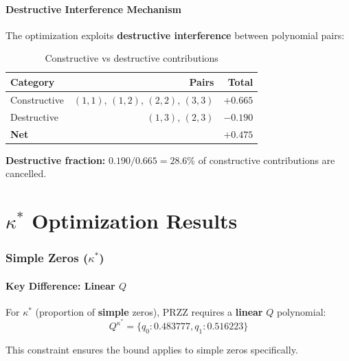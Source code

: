 \documentclass[11pt]{article}
\begin{document}
\subsection{Destructive Interference Mechanism}

The optimization exploits \textbf{destructive interference} between polynomial pairs:

\begin{table}[h]
\centering
\caption{Constructive vs destructive contributions}
\begin{tabular}{lrr}
\toprule
Category & Pairs & Total \\
\midrule
Constructive & $(1,1)$, $(1,2)$, $(2,2)$, $(3,3)$ & $+0.665$ \\
Destructive & $(1,3)$, $(2,3)$ & $-0.190$ \\
\midrule
\textbf{Net} & & $+0.475$ \\
\bottomrule
\end{tabular}
\end{table}

\textbf{Destructive fraction:} $0.190 / 0.665 = 28.6\%$ of constructive contributions are cancelled.


\part{$\kappa^*$ Optimization Results}

\section{Simple Zeros ($\kappa^*$)}
\label{sec:kappa_star}

\subsection{Key Difference: Linear $Q$}

For $\kappa^*$ (proportion of \textbf{simple} zeros), PRZZ requires a \textbf{linear} $Q$ polynomial:
\begin{equation}
\boxed{Q^{\kappa^*} = \{q_0: 0.483777, q_1: 0.516223\}}
\end{equation}

This constraint ensures the bound applies to simple zeros specifically.
\end{document}
